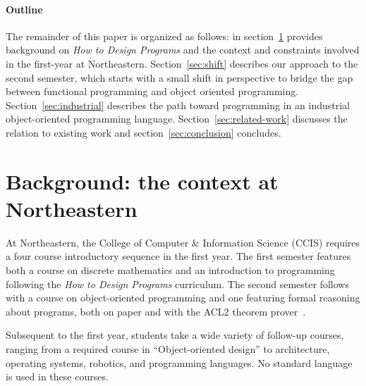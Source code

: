 \documentclass[submission,copyright]{eptcs}
\begin{document}
\paragraph{Outline} The remainder of this paper is organized as follows:
in section~\ref{sec:background} provides background on \emph{How to
  Design Programs} and the context and constraints involved in the
first-year at Northeastern.  Section~\ref{sec:shift} describes our
approach to the second semester, which starts with a small shift in
perspective to bridge the gap between functional programming and
object oriented programming.  Section~\ref{sec:industrial} describes
the path toward programming in an industrial object-oriented
programming language.  Section~\ref{sec:related-work} discusses the
relation to existing work and section~\ref{sec:conclusion} concludes.




\section{Background: the context at Northeastern}
\label{sec:background}

At Northeastern, the College of Computer \& Information Science (CCIS)
requires a four course introductory sequence in the first year.  The
first semester features both a course on discrete mathematics and
 an introduction to programming following the \emph{How to Design
  Programs} curriculum.  The second semester follows with a course on
object-oriented programming and one featuring formal reasoning about
programs, both on paper and with the ACL2 theorem
prover~\cite{dvanhorn:Kaufmann2000ComputerAided}.

Subsequent to the first year, students take a wide variety of
follow-up courses, ranging from a required course in ``Object-oriented
design'' to architecture, operating systems, robotics, and programming
languages.  No standard language is used in these courses.  
\end{document}
